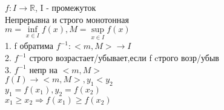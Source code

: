 \begin{theorem}
	$ f : I \rightarrow \mathbb{R} $, I - промежуток \\
	Непрерывна и строго монотонная \\
	$ m = \inf\limits_{x \in I} f(x) , M =  \sup\limits_{x \in I} f(x) $\\
	1. f обратима $ f^{-1} : <m, M> \rightarrow I $ \\
	2. $ f^{-1} $ строго возрастает/убывает,если f cтрого возр/убыв \\
	3. $ f^{-1} $ непр на $ <m, M> $\\
	$ f(I) \rightarrow <m, M>, y_1 < y_2 $ \\
	$ y_1 = f ( x_1 ) , y_2 = f(x_2) $ \\
	$ x_1 \geq x_2 \Rightarrow f(x_1) \geq f(x_2) $ %
\end{theorem}





